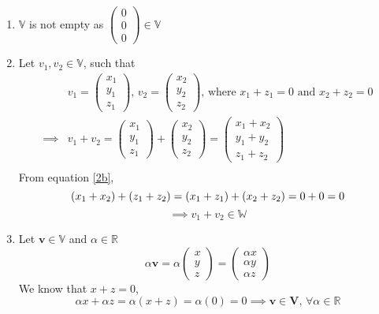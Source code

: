 \documentclass[12pt, letterpaper]{article}
\begin{document}
\begin{enumerate}
  \item $\mathbb{V}$ is not empty as $\begin{pmatrix}0\\0\\0\end{pmatrix}\in\mathbb{V}$
  \item Let $v_1, v_2 \in \mathbb{V}$, such that
  \begin{equation}
    \label{2b}
    \begin{split}
    &v_1 = \begin{pmatrix}x_1\\y_1\\z_1\end{pmatrix},\,
    v_2 = \begin{pmatrix}x_2\\y_2\\z_2\end{pmatrix},\,
    \text{where }x_1 + z_1 = 0\text{ and }x_2 + z_2 = 0\\
    \implies &v_1 + v_2
    = \begin{pmatrix}x_1\\y_1\\z_1\end{pmatrix} +
    \begin{pmatrix}x_2\\y_2\\z_2\end{pmatrix}
    =\begin{pmatrix}x_1 + x_2\\y_1 + y_2\\z_1 + z_2\end{pmatrix}\\
    \end{split}
  \end{equation}
  From equation \ref{2b},
  \[ (x_1 + x_2) + (z_1 + z_2) = (x_1 + z_1) + (x_2 + z_2) = 0 + 0 = 0\\ \]
  \[ \implies \boxed{v_1 + v_2 \in \mathbb{W}} \]

  \item Let $\mathbf{v} \in \mathbb{V}$ and $\alpha \in \mathbb{R}$
    \[
      \alpha \mathbf{v} = \alpha\begin{pmatrix}x\\y\\z\end{pmatrix}
      = \begin{pmatrix}\alpha x\\ \alpha y\\ \alpha z\end{pmatrix}
    \]
    We know that $x + z = 0$,
    \[
      \alpha x + \alpha z = \alpha (x + z) = \alpha (0) = 0
      \implies \boxed{\mathbf{v} \in \mathbf{V},\, \forall \alpha \in \mathbb{R}}
    \]
\end{enumerate}
\end{document}

